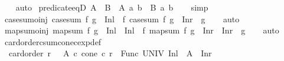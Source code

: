 \begin{isabellebody}
%
\isadelimproof
\ \ %
\endisadelimproof
%
\isatagproof
{}\isamarkupfalse%
\ auto%
\endisatagproof
{\isafoldproof}%
%
\isadelimproof
\isanewline
%
\endisadelimproof
\isanewline
{}\isamarkupfalse%
\ predicate{}{\isacharunderscore}{\kern0pt}eqD{\isacharcolon}{\kern0pt}\ {\isachardoublequoteopen}A\ {\isacharequal}{\kern0pt}\ B\ {\isasymLongrightarrow}\ A\ a\ b\ {\isasymlongleftrightarrow}\ B\ a\ b{\isachardoublequoteclose}\isanewline
%
\isadelimproof
\ \ %
\endisadelimproof
%
\isatagproof
{}\isamarkupfalse%
\ simp%
\endisatagproof
{\isafoldproof}%
%
\isadelimproof
\isanewline
%
\endisadelimproof
\isanewline
{}\isamarkupfalse%
\ case{\isacharunderscore}{\kern0pt}sum{\isacharunderscore}{\kern0pt}o{\isacharunderscore}{\kern0pt}inj{\isacharcolon}{\kern0pt}\ {\isachardoublequoteopen}case{\isacharunderscore}{\kern0pt}sum\ f\ g\ {\isasymcirc}\ Inl\ {\isacharequal}{\kern0pt}\ f{\isachardoublequoteclose}\ {\isachardoublequoteopen}case{\isacharunderscore}{\kern0pt}sum\ f\ g\ {\isasymcirc}\ Inr\ {\isacharequal}{\kern0pt}\ g{\isachardoublequoteclose}\isanewline
%
\isadelimproof
\ \ %
\endisadelimproof
%
\isatagproof
{}\isamarkupfalse%
\ auto%
\endisatagproof
{\isafoldproof}%
%
\isadelimproof
\isanewline
%
\endisadelimproof
\isanewline
{}\isamarkupfalse%
\ map{\isacharunderscore}{\kern0pt}sum{\isacharunderscore}{\kern0pt}o{\isacharunderscore}{\kern0pt}inj{\isacharcolon}{\kern0pt}\ {\isachardoublequoteopen}map{\isacharunderscore}{\kern0pt}sum\ f\ g\ {\isasymcirc}\ Inl\ {\isacharequal}{\kern0pt}\ Inl\ {\isasymcirc}\ f{\isachardoublequoteclose}\ {\isachardoublequoteopen}map{\isacharunderscore}{\kern0pt}sum\ f\ g\ {\isasymcirc}\ Inr\ {\isacharequal}{\kern0pt}\ Inr\ {\isasymcirc}\ g{\isachardoublequoteclose}\isanewline
%
\isadelimproof
\ \ %
\endisadelimproof
%
\isatagproof
{}\isamarkupfalse%
\ auto%
\endisatagproof
{\isafoldproof}%
%
\isadelimproof
\isanewline
%
\endisadelimproof
\isanewline
{}\isamarkupfalse%
\ card{\isacharunderscore}{\kern0pt}order{\isacharunderscore}{\kern0pt}csum{\isacharunderscore}{\kern0pt}cone{\isacharunderscore}{\kern0pt}cexp{\isacharunderscore}{\kern0pt}def{\isacharcolon}{\kern0pt}\isanewline
\ \ {\isachardoublequoteopen}card{\isacharunderscore}{\kern0pt}order\ r\ {\isasymLongrightarrow}\ {\isacharparenleft}{\kern0pt}\ {\isacharbar}{\kern0pt}A{}{\isacharbar}{\kern0pt}\ {\isacharplus}{\kern0pt}c\ cone{\isacharparenright}{\kern0pt}\ {\isacharcircum}{\kern0pt}c\ r\ {\isacharequal}{\kern0pt}\ {\isacharbar}{\kern0pt}Func\ UNIV\ {\isacharparenleft}{\kern0pt}Inl\ {\isacharbackquote}{\kern0pt}\ A{}\ {\isasymunion}\ {\isacharbraceleft}{\kern0pt}Inr\ {\isacharparenleft}{\kern0pt}{\isacharparenright}{\kern0pt}{\isacharbraceright}{\kern0pt}{\isacharparenright}{\kern0pt}{\isacharbar}{\kern0pt}{\isachardoublequoteclose}\isanewline

\end{isabellebody}
